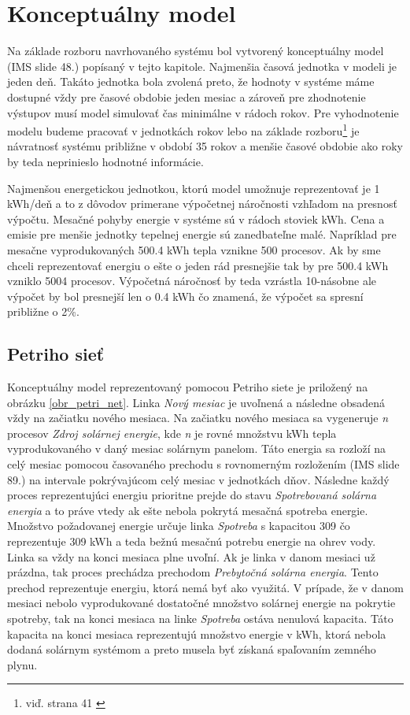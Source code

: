 \documentclass[a4paper, 11pt]{article}
\begin{document}
\section{Konceptuálny model}
Na základe rozboru navrhovaného systému bol vytvorený konceptuálny model (IMS\cite{ims_slides} slide 48.) popísaný v tejto kapitole.  Najmenšia časová jednotka v modeli je jeden deň. Takáto jednotka bola zvolená preto, že hodnoty v systéme máme dostupné vždy pre časové obdobie jeden mesiac a zároveň pre zhodnotenie výstupov musí model simulovať čas minimálne v rádoch rokov. Pre vyhodnotenie modelu budeme pracovať v jednotkách rokov lebo na základe rozboru\footnote{viď. strana 41 \cite{bc_solar_system}} je návratnosť systému približne v období 35 rokov a menšie časové obdobie ako roky by teda neprinieslo hodnotné informácie. 

Najmenšou energetickou jednotkou, ktorú model umožnuje reprezentovať je 1 kWh/deň a to z dôvodov primerane výpočetnej náročnosti vzhľadom na presnosť výpočtu. Mesačné pohyby energie v systéme sú v rádoch stoviek kWh. Cena a emisie pre menšie jednotky tepelnej energie sú zanedbateľne malé. Napríklad pre mesačne vyprodukovaných 500.4 kWh tepla vznikne 500 procesov. Ak by sme chceli reprezentovať energiu o ešte o jeden rád presnejšie tak by pre 500.4 kWh vzniklo 5004 procesov. Výpočetná náročnosť by teda vzrástla 10-násobne ale výpočet by bol presnejší len o 0.4 kWh čo znamená, že výpočet sa spresní približne o 2\%.


\subsection{Petriho sieť}
Konceptuálny model reprezentovaný pomocou Petriho siete je priložený na obrázku \ref{obr_petri_net}. Linka \textit{Nový mesiac} je uvoľnená a následne obsadená vždy na začiatku nového mesiaca. Na začiatku nového mesiaca sa vygeneruje \textit{n} procesov \textit{Zdroj solárnej energie}, kde \textit{n} je rovné množstvu kWh tepla vyprodukovaného v daný mesiac solárnym panelom. Táto energia sa rozloží na celý mesiac pomocou časovaného prechodu s rovnomerným rozložením (IMS\cite{ims_slides} slide 89.) na intervale pokrývajúcom celý mesiac v jednotkách dňov. Následne každý proces reprezentujúci energiu prioritne prejde do stavu \textit{Spotrebovaná solárna energia} a to práve vtedy ak ešte nebola pokrytá mesačná spotreba energie. Množstvo požadovanej energie určuje linka \textit{Spotreba} s kapacitou 309 čo reprezentuje 309 kWh a teda bežnú mesačnú potrebu energie na ohrev vody. Linka sa vždy na konci mesiaca plne uvoľní. Ak je linka v danom mesiaci už prázdna, tak proces prechádza prechodom \textit{Prebytočná solárna energia}. Tento prechod reprezentuje energiu, ktorá nemá byť ako využitá. V prípade, že v danom mesiaci nebolo vyprodukované dostatočné množstvo solárnej energie na pokrytie spotreby, tak na konci mesiaca na linke \textit{Spotreba} ostáva nenulová kapacita. Táto kapacita na konci mesiaca reprezentujú množstvo energie v kWh, ktorá nebola dodaná solárnym systémom a preto musela byť získaná spaľovaním zemného plynu.
\end{document}
